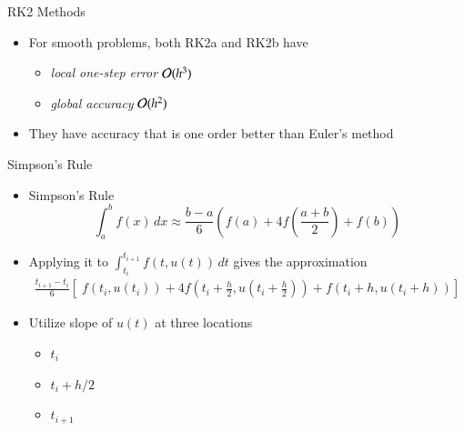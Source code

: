 \documentclass[10pt]{beamer}
\begin{document}
\begin{frame}{RK2 Methods}

\begin{itemize}
    \item For smooth problems, both RK2a and RK2b have 
    \begin{itemize}
        \item \textit{local one-step error} ${\mathcal{O}}(h^3)$
        \item \textit{global accuracy} ${\mathcal{O}}(h^2)$
    \end{itemize}

    \item They have accuracy that is one order better than Euler's method
\end{itemize}


\end{frame}


\begin{frame}{Simpson's Rule}
\begin{itemize}
    \item Simpson's Rule
    $$
    \int_a^b f(x) \,dx \approx \frac{b-a}{6} \left(f(a)+4f\left(\frac{a+b}{2}\right)+f(b)\right)
    $$
    \item Applying it to $\int_{t_i}^{t_{i+1}} f(t, u(t))\,dt$ gives the approximation
    \begin{align*}
    \frac{t_{i+1}-t_i}{6}\left[\;f(t_i,u(t_i))+4f\left(t_{i}+\frac{h}{2},u\left(t_{i}+\frac{h}{2}\right)\right)+f(t_i+h,u(t_i+h))\right]
    \end{align*}

    \item Utilize slope of $u(t)$ at three locations
    \begin{itemize}
        \item $t_i$
        \item $t_i+h/2$
        \item $t_{i+1}$
    \end{itemize}
\end{itemize}
\end{frame}
\end{document}
